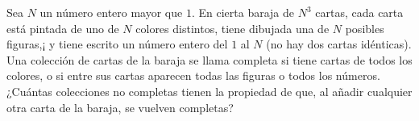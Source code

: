 Sea $N$ un número entero mayor que $1$. En cierta baraja de $N^3$ cartas, cada carta está pintada de uno de $N$ colores distintos, tiene dibujada una de $N$ posibles figuras,¡ y tiene escrito un número entero del $1$ al $N$ (no hay dos cartas idénticas). Una colección de cartas de la baraja se llama completa si tiene cartas de todos los colores, o si entre sus cartas aparecen todas las figuras o todos los números. ¿Cuántas colecciones no completas tienen la propiedad de que, al añadir cualquier otra carta de la baraja, se vuelven completas?